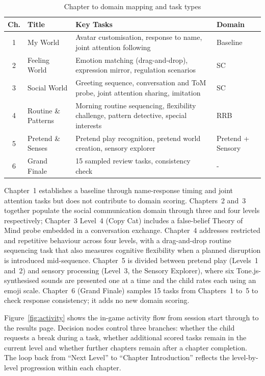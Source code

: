 \documentclass[12pt,a4paper,oneside]{report}
\begin{document}
\begin{table}[t]
  \caption{Chapter to domain mapping and task types}
  \label{tab:chapters}
  \begin{tabularx}{\linewidth}{clXl}
    \toprule
    \textbf{Ch.} & \textbf{Title} & \textbf{Key Tasks} & \textbf{Domain} \\
    \midrule
    1 & My World            & Avatar customisation, response to name, joint attention following & Baseline \\
    2 & Feeling World       & Emotion matching (drag-and-drop), expression mirror, regulation scenarios & SC \\
    3 & Social World        & Greeting sequence, conversation and ToM probe, joint attention sharing, imitation & SC \\
    4 & Routine \& Patterns & Morning routine sequencing, flexibility challenge, pattern detective, special interests & RRB \\
    5 & Pretend \& Senses   & Pretend play recognition, pretend world creation, sensory explorer & Pretend + Sensory \\
    6 & Grand Finale        & 15 sampled review tasks, consistency check & - \\
    \bottomrule
  \end{tabularx}
\end{table}

Chapter~1 establishes a baseline through name-response timing and joint attention tasks but does not contribute to domain scoring. Chapters~2 and~3 together populate the social communication domain through three and four levels respectively; Chapter~3 Level~4 (Copy Cat) includes a false-belief Theory of Mind probe embedded in a conversation exchange. Chapter~4 addresses restricted and repetitive behaviour across four levels, with a drag-and-drop routine sequencing task that also measures cognitive flexibility when a planned disruption is introduced mid-sequence. Chapter~5 is divided between pretend play (Levels~1 and~2) and sensory processing (Level~3, the Sensory Explorer), where six Tone.js-synthesised sounds are presented one at a time and the child rates each using an emoji scale. Chapter~6 (Grand Finale) samples 15 tasks from Chapters~1 to~5 to check response consistency; it adds no new domain scoring.

Figure~\ref{fig:activity} shows the in-game activity flow from session start through to the results page. Decision nodes control three branches: whether the child requests a break during a task, whether additional scored tasks remain in the current level and whether further chapters remain after a chapter completion. The loop back from ``Next Level'' to ``Chapter Introduction'' reflects the level-by-level progression within each chapter.
\end{document}
